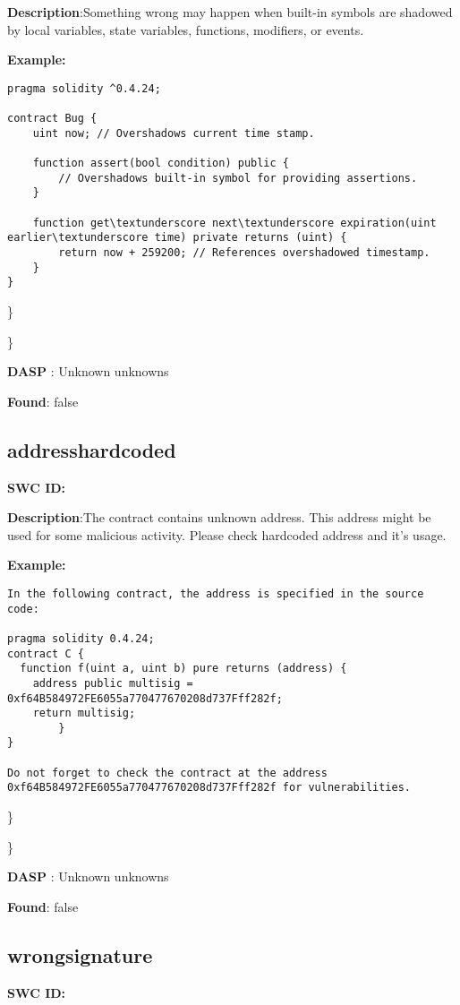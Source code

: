 \documentclass{article}
\begin{document}
\textbf{Description}:Something wrong may happen when built-in symbols are shadowed by local variables, state variables, functions, modifiers, or events.


\textbf{Example:} 
\begin{verbatim}
pragma solidity ^0.4.24;

contract Bug {
    uint now; // Overshadows current time stamp.

    function assert(bool condition) public {
        // Overshadows built-in symbol for providing assertions.
    }

    function get\textunderscore next\textunderscore expiration(uint earlier\textunderscore time) private returns (uint) {
        return now + 259200; // References overshadowed timestamp.
    }
}

\end{verbatim}\} 

\} 

\textbf{DASP} : Unknown unknowns

\textbf{Found}: false

\subsection{address\textunderscore hardcoded} 
\textbf{SWC \textunderscore ID:} 

\textbf{Description}:The contract contains unknown address. This address might be used for some malicious activity. Please check hardcoded address and it's usage.


\textbf{Example:} 
\begin{verbatim}
In the following contract, the address is specified in the source code:

pragma solidity 0.4.24;
contract C {
  function f(uint a, uint b) pure returns (address) {
    address public multisig = 0xf64B584972FE6055a770477670208d737Fff282f;
    return multisig;
        }
}

Do not forget to check the contract at the address 0xf64B584972FE6055a770477670208d737Fff282f for vulnerabilities.

\end{verbatim}\} 

\} 

\textbf{DASP} : Unknown unknowns

\textbf{Found}: false

\subsection{wrong\textunderscore signature} 
\textbf{SWC \textunderscore ID:} 
\end{document}
